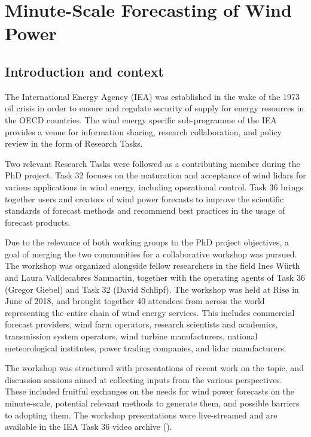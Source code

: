 \chapter{Minute-Scale Forecasting of Wind Power}


\clearpage
\section{Introduction and context}

The International Energy Agency (IEA) was established in the wake of the 1973 oil crisis in order to ensure and regulate security of supply for energy resources in the OECD countries. The wind energy specific sub-programme of the IEA provides a venue for information sharing, research collaboration, and policy review in the form of Research Tasks.

Two relevant Research Tasks were followed as a contributing member during the PhD project.  Task 32 focuses on the maturation and acceptance of wind lidars for various applications in wind energy, including operational control. Task 36 brings together users and creators of wind power forecasts to improve the scientific standards of forecast methods and recommend best practices in the usage of forecast products.

Due to the relevance of both working groups to the PhD project objectives, a goal of merging the two communities for a collaborative workshop was pursued. The workshop was organized alongside fellow researchers in the field Ines W\"urth and Laura Valldecabres Sanmartin, together with the operating agents of Task 36 (Gregor Giebel) and Task 32 (David Schlipf).
The workshop was held at Ris{\o} in June of 2018, and brought together 40 attendees from across the world representing the entire chain of wind energy services.  This includes commercial forecast providers, wind farm operators, research scientists and academics, transmission system operators, wind turbine manufacturers, national meteorological institutes, power trading companies, and lidar manufacturers. 

The workshop was structured with presentations of recent work on the topic, and discussion sessions aimed at collecting inputs from the various perspectives. These included fruitful exchanges on the needs for wind power forecasts on the minute-scale, potential relevant methods to generate them, and possible barriers to adopting them. The workshop presentations were live-streamed and are available in the IEA Task 36 video archive (\cite{iea_36_youtube}).

